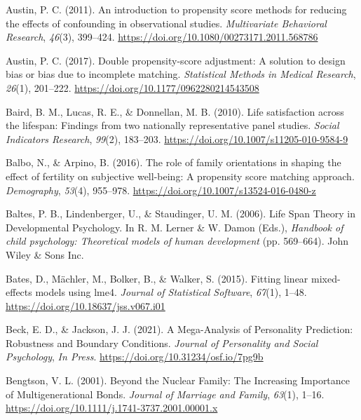 \documentclass[
  english,
  man, noextraspace,floatsintext]{apa7}
\begin{document}
\leavevmode\hypertarget{ref-austinIntroductionPropensityScore2011}{}%
Austin, P. C. (2011). An introduction to propensity score methods for reducing the effects of confounding in observational studies. \emph{Multivariate Behavioral Research}, \emph{46}(3), 399--424. \url{https://doi.org/10.1080/00273171.2011.568786}

\leavevmode\hypertarget{ref-austinDoublePropensityscoreAdjustment2017}{}%
Austin, P. C. (2017). Double propensity-score adjustment: A solution to design bias or bias due to incomplete matching. \emph{Statistical Methods in Medical Research}, \emph{26}(1), 201--222. \url{https://doi.org/10.1177/0962280214543508}

\leavevmode\hypertarget{ref-bairdLifeSatisfactionLifespan2010}{}%
Baird, B. M., Lucas, R. E., \& Donnellan, M. B. (2010). Life satisfaction across the lifespan: Findings from two nationally representative panel studies. \emph{Social Indicators Research}, \emph{99}(2), 183--203. \url{https://doi.org/10.1007/s11205-010-9584-9}

\leavevmode\hypertarget{ref-balboRoleFamilyOrientations2016}{}%
Balbo, N., \& Arpino, B. (2016). The role of family orientations in shaping the effect of fertility on subjective well-being: A propensity score matching approach. \emph{Demography}, \emph{53}(4), 955--978. \url{https://doi.org/10.1007/s13524-016-0480-z}

\leavevmode\hypertarget{ref-baltesLifeSpanTheory2006}{}%
Baltes, P. B., Lindenberger, U., \& Staudinger, U. M. (2006). Life Span Theory in Developmental Psychology. In R. M. Lerner \& W. Damon (Eds.), \emph{Handbook of child psychology: Theoretical models of human development} (pp. 569--664). John Wiley \& Sons Inc.

\leavevmode\hypertarget{ref-R-lme4}{}%
Bates, D., Mächler, M., Bolker, B., \& Walker, S. (2015). Fitting linear mixed-effects models using lme4. \emph{Journal of Statistical Software}, \emph{67}(1), 1--48. \url{https://doi.org/10.18637/jss.v067.i01}

\leavevmode\hypertarget{ref-beckMegaAnalysisPersonalityPrediction2021}{}%
Beck, E. D., \& Jackson, J. J. (2021). A Mega-Analysis of Personality Prediction: Robustness and Boundary Conditions. \emph{Journal of Personality and Social Psychology}, \emph{In Press}. \url{https://doi.org/10.31234/osf.io/7pg9b}

\leavevmode\hypertarget{ref-bengtsonNuclearFamilyIncreasing2001}{}%
Bengtson, V. L. (2001). Beyond the Nuclear Family: The Increasing Importance of Multigenerational Bonds. \emph{Journal of Marriage and Family}, \emph{63}(1), 1--16. \url{https://doi.org/10.1111/j.1741-3737.2001.00001.x}
\end{document}
